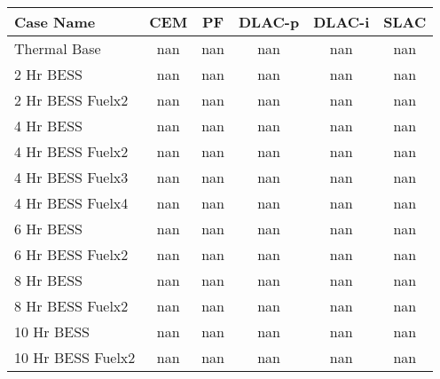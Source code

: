 \begin{tabular}{lccccc}
\toprule
Case Name & CEM & PF & DLAC-p & DLAC-i & SLAC \\
\midrule
Thermal Base & nan & nan & nan & nan & nan \\
2 Hr BESS & nan & nan & nan & nan & nan \\
2 Hr BESS Fuelx2 & nan & nan & nan & nan & nan \\
4 Hr BESS & nan & nan & nan & nan & nan \\
4 Hr BESS Fuelx2 & nan & nan & nan & nan & nan \\
4 Hr BESS Fuelx3 & nan & nan & nan & nan & nan \\
4 Hr BESS Fuelx4 & nan & nan & nan & nan & nan \\
6 Hr BESS & nan & nan & nan & nan & nan \\
6 Hr BESS Fuelx2 & nan & nan & nan & nan & nan \\
8 Hr BESS & nan & nan & nan & nan & nan \\
8 Hr BESS Fuelx2 & nan & nan & nan & nan & nan \\
10 Hr BESS & nan & nan & nan & nan & nan \\
10 Hr BESS Fuelx2 & nan & nan & nan & nan & nan \\
\bottomrule
\end{tabular}
